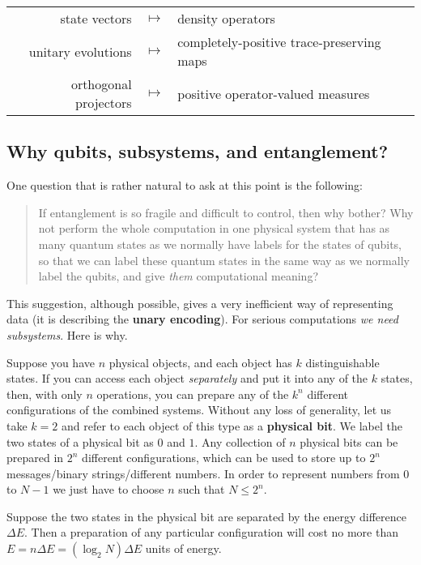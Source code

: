 \documentclass[fleqn]{article}
\begin{document}
\begin{longtable}[]{@{}rcl@{}}
\toprule
\endhead
state vectors & \(\longmapsto\) & density operators\tabularnewline
unitary evolutions & \(\longmapsto\) & completely-positive trace-preserving maps\tabularnewline
orthogonal projectors & \(\longmapsto\) & positive operator-valued measures\tabularnewline
\bottomrule
\end{longtable}

\hypertarget{why-qubits-subsystems-and-entanglement}{%
\subsection{Why qubits, subsystems, and entanglement?}\label{why-qubits-subsystems-and-entanglement}}

One question that is rather natural to ask at this point is the following:

\begin{quote}
If entanglement is so fragile and difficult to control, then why bother?
Why not perform the whole computation in one physical system that has as many quantum states as we normally have labels for the states of qubits, so that we can label these quantum states in the same way as we normally label the qubits, and give \emph{them} computational meaning?
\end{quote}

This suggestion, although possible, gives a very inefficient way of representing data (it is describing the \textbf{unary encoding}).
For serious computations \emph{we need subsystems}.
Here is why.

Suppose you have \(n\) physical objects, and each object has \(k\) distinguishable states.
If you can access each object \emph{separately} and put it into any of the \(k\) states, then, with only \(n\) operations, you can prepare any of the \(k^{n}\) different configurations of the combined systems.
Without any loss of generality, let us take \(k=2\) and refer to each object of this type as a \textbf{physical bit}.
We label the two states of a physical bit as \(0\) and \(1\).
Any collection of \(n\) physical bits can be prepared in \(2^{n}\) different configurations, which can be used to store up to \(2^{n}\) messages/binary strings/different numbers.
In order to represent numbers from \(0\) to \(N-1\) we just have to choose \(n\) such that \(N\leqslant 2^n\).

Suppose the two states in the physical bit are separated by the energy difference \(\Delta E\).
Then a preparation of any particular configuration will cost no more than \(E=n \Delta E=(\log_2 N)\Delta E\) units of energy.
\end{document}

